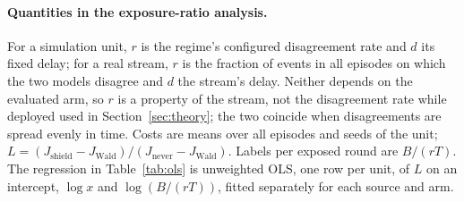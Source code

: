 \documentclass[10pt]{article}
\theoremstyle{plain}
\theoremstyle{definition}
\begin{document}
\paragraph{Quantities in the exposure-ratio analysis.} For a simulation unit, $r$ is the regime's configured disagreement rate and $d$ its fixed delay; for a real stream, $r$ is the fraction of events in all episodes on which the two models disagree and $d$ the stream's delay. Neither depends on the evaluated arm, so $r$ is a property of the stream, not the disagreement rate while deployed used in Section~\ref{sec:theory}; the two coincide when disagreements are spread evenly in time. Costs are means over all episodes and seeds of the unit; $L=(J_{\text{shield}}-J_{\text{Wald}})/(J_{\text{never}}-J_{\text{Wald}})$. Labels per exposed round are $B/(rT)$. The regression in Table~\ref{tab:ols} is unweighted OLS, one row per unit, of $L$ on an intercept, $\log x$ and $\log(B/(rT))$, fitted separately for each source and arm.
\begin{table}[!htbp]
\caption{Unweighted OLS of $L$ on an intercept, $\log x$ and $\log(B/(rT))$, the log labels available per expected disagreement; one row per analysis unit, fitted separately by source and arm.}
\label{tab:ols}\centering\small
\end{table}

\begin{table}[!htbp]
\caption{Post hoc comparison: Spearman correlation with $L$ of the exposure ratio $x=rd/h$, of $d/h$ and of $1/h$, on the units of Table~\ref{tab:regime}.}
\label{tab:predictors}\centering\small
\end{table}
\end{document}
